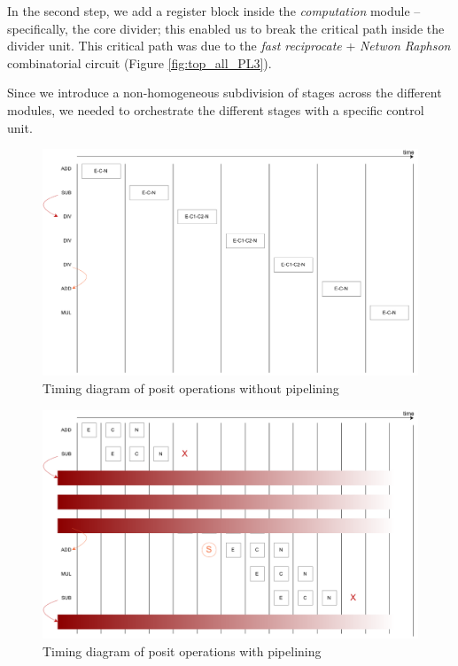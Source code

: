 In the second step, we add a register block inside the \textit{computation} module -- specifically, the core divider; this  enabled us to break the critical path inside the divider unit. This critical path was due to the \textit{fast reciprocate} + \textit{Netwon Raphson} combinatorial circuit (Figure \ref{fig:top_all_PL3}).



Since we introduce a non-homogeneous subdivision of stages across the different modules, we needed to orchestrate the different stages with a specific control unit.



\begin{figure}
    \centering
    \includegraphics[width=\textwidth]{figures/pipeline_ops_diagram1.pdf}
    \caption{Timing diagram of posit operations without pipelining}
    \label{fig:timing_diagram_4_stagesdiv_3stagesothers_without_pipelining}
\end{figure}
\begin{figure}
    \centering
    \includegraphics[width=\textwidth]{figures/pipeline_ops_diagram2.pdf}
    \caption{Timing diagram of posit operations with pipelining}
    \label{fig:timing_diagram_4_stagesdiv_3stagesothers_with_pipelining}
\end{figure}



